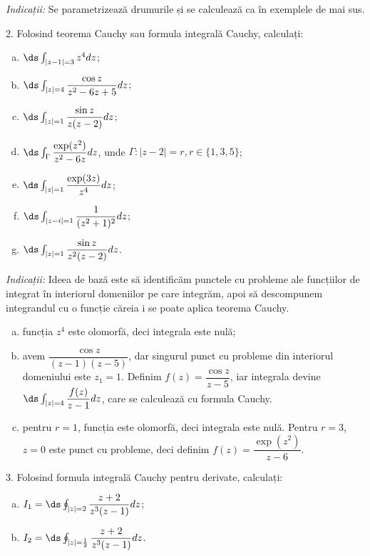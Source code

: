 \emph{Indicații:} Se parametrizează drumurile și se calculează ca în exemplele
de mai sus.

\vspace{0.3cm}

2. Folosind teorema Cauchy sau formula integrală Cauchy, calculați:
\begin{enumerate}[(a)]
\item $ \ds\int_{|z - 1| = 3} z^4 dz $;
\item $ \ds\int_{|z| = 4} \dfrac{\cos z}{z^2 - 6z + 5}dz $;
\item $ \ds\int_{|z| = 1} \dfrac{\sin z}{z(z-2)} dz $;
\item $ \ds\int_\Gamma \dfrac{\exp(z^2)}{z^2 - 6z} dz $, unde $ \Gamma: |z - 2| = r, r \in \{1, 3, 5\} $;
\item $ \ds\int_{|z| = 1} \dfrac{\exp(3z)}{z^4} dz $;
\item $ \ds\int_{|z - i| = 1} \dfrac{1}{(z^2 + 1)^2} dz $;
\item $ \ds\int_{|z| = 1} \dfrac{\sin z}{z^2(z - 2)} dz $.
\end{enumerate}

\emph{Indicații:} Ideea de bază este să identificăm punctele cu probleme ale
funcțiilor de integrat în interiorul domeniilor pe care integrăm, apoi să descompunem
integrandul cu o funcție căreia i se poate aplica teorema Cauchy.
\begin{enumerate}[(a)]
\item funcția $ z^4 $ este olomorfă, deci integrala este nulă;
\item avem $ \dfrac{\cos z}{(z - 1)(z - 5)} $, dar singurul punct cu probleme din interiorul
  domeniului este $ z_1 = 1 $. Definim $ f(z) = \dfrac{\cos z}{z - 5} $, iar integrala
  devine $ \ds\int_{|z| = 4} \dfrac{f(z)}{z - 1} dz $, care se calculează cu formula Cauchy.
\item pentru $ r = 1 $, funcția este olomorfă, deci integrala este nulă. Pentru $ r = 3 $,
  $ z = 0 $ este punct cu probleme, deci definim $ f(z) = \dfrac{\exp(z^2)}{z - 6} $.
\end{enumerate}

\vspace{0.3cm}

3. Folosind formula integrală Cauchy pentru derivate, calculați:
\begin{enumerate}[(a)]
\item $ I_1 = \ds\oint_{|z| = 2} \dfrac{z + 2}{z^3(z - 1)} dz $;
\item $ I_2 = \ds\oint_{|z| = \frac{1}{2}} \dfrac{z + 2}{z^3(z - 1)} dz $.
\end{enumerate}

